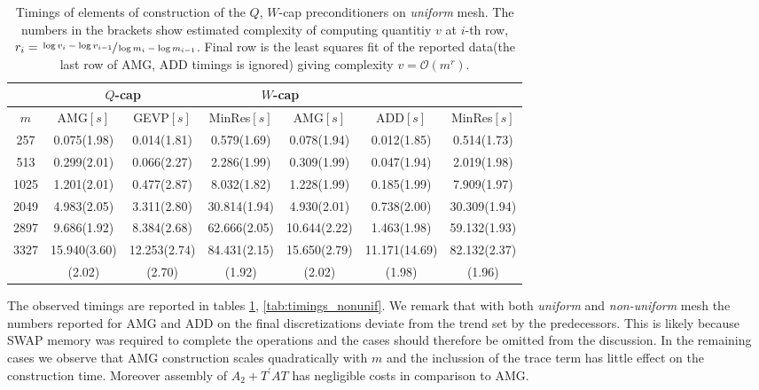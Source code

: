 \documentclass[10pt, a4paper]{article}
\newcommand{\dual}[1]{\ensuremath{{#1}^{\prime}}}
\begin{document}
\begin{table}[ht]
  \caption{Timings of elements of construction of the $Q$, $W$-cap
  preconditioners on \textit{uniform} mesh. The numbers in the brackets show 
  estimated complexity of computing quantitiy $v$ at $i$-th row,
  $r_i=\sfrac{\log{v_i}-\log{v_{i-1}}}{\log{m_i}-\log{m_{i-1}}}$. Final row is
  the least squares fit of the reported data(the last row of AMG, ADD
  timings is ignored) giving complexity $v=\mathcal{O}(m^r)$.
}
\label{tab:timings_unif}
\footnotesize{
\begin{tabular}{c|cccccc}
\hline
 & \multicolumn{2}{c|}{$Q$-cap} & \multicolumn{2}{c}{$W$-cap}\\
\hline
  $m$ & AMG$\left[s\right]$ & GEVP$\left[s\right]$ & MinRes$\left[s\right]$ &
        AMG$\left[s\right]$ & ADD$\left[s\right]$  & MinRes$\left[s\right]$ \\
\hline
  257  & 0.075(1.98)  & 0.014(1.81)  &  0.579(1.69)  & 0.078(1.94)  & 0.012(1.85)   & 0.514(1.73)  \\
  513  & 0.299(2.01)  & 0.066(2.27)  &  2.286(1.99)  & 0.309(1.99)  & 0.047(1.94)   & 2.019(1.98)  \\
  1025 & 1.201(2.01)  & 0.477(2.87)  &  8.032(1.82)  & 1.228(1.99)  & 0.185(1.99)   & 7.909(1.97)  \\
  2049 & 4.983(2.05)  & 3.311(2.80)  &  30.814(1.94) & 4.930(2.01)  & 0.738(2.00)   & 30.309(1.94) \\
  2897 & 9.686(1.92)  & 8.384(2.68)  &  62.666(2.05) & 10.644(2.22) & 1.463(1.98)   & 59.132(1.93) \\
  3327 & 15.940(3.60) & 12.253(2.74) &  84.431(2.15) & 15.650(2.79) & 11.171(14.69) & 82.132(2.37) \\
\hline
  & (2.02) & (2.70) & (1.92) &
    (2.02) & (1.98) & (1.96) \\
\hline
\end{tabular}
}
\end{table}
%
The observed timings are reported in tables \ref{tab:timings_unif},
\ref{tab:timings_nonunif}. We remark that with both \textit{uniform} and \textit{non-uniform} 
mesh the numbers reported for AMG and ADD on the final discretizations deviate 
from the trend set by the predecessors. This is likely because SWAP memory was 
required to complete the operations and the cases should therefore be omitted 
from the discussion. In the remaining cases we observe that AMG construction 
scales quadratically with $m$ and the inclussion of the trace term has little effect 
on the construction time. Moreover assembly of $A_2+\dual{T}AT$ has negligible 
costs in comparison to AMG.
\end{document}
